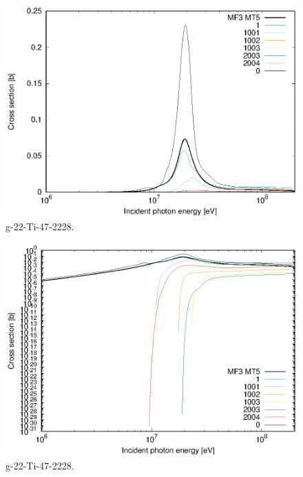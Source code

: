 \begin{figure}
 \includegraphics[width=\linewidth]{eps/g_22-Ti-47_2228.eps}
  \caption{g-22-Ti-47-2228.}
\end{figure}
\begin{figure}
 \includegraphics[width=\linewidth]{eps-log/g_22-Ti-47_2228.eps}
 \caption{g-22-Ti-47-2228.}
\end{figure}
\newpage \clearpage

